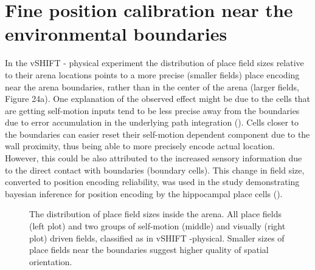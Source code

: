\section{Fine position calibration near the environmental boundaries}
\label{sec:fine_position_calib}

In the vSHIFT - physical experiment the distribution of place field sizes relative to their arena locations points to a more precise (smaller fields) place encoding near the arena boundaries, rather than in the center of the arena (larger fields, Figure 24a). One explanation of the observed effect might be due to the cells that are getting self-motion inputs tend to be less precise away from the boundaries due to error accumulation in the underlying path integration (\cite{Etienne1996}). Cells closer to the boundaries can easier reset their self-motion dependent component due to the wall proximity, thus being able to more precisely encode actual location. However, this could be also attributed to the increased sensory information due to the direct contact with boundaries (boundary cells). This change in field size, converted to position encoding reliability, was used in the study demonstrating bayesian inference for position encoding by the hippocampal place cells (\cite{Madl2014}).

\begin{figure}
\captionsetup{format=plain}
\caption[Position accuracy based on fields sizes]{
The distribution of place field sizes inside the arena. All place fields (left plot) and two groups of self-motion (middle) and visually (right plot) driven fields, classified as in vSHIFT -physical. Smaller sizes of place fields near the boundaries suggest higher quality of spatial orientation.
}
\label{fig:F24_field_sizes}
\end{figure}


